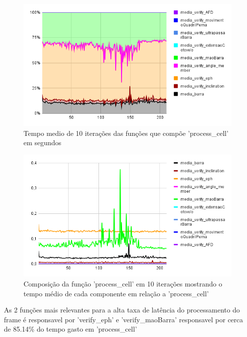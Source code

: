 \begin{figure}[!htb]
	\centering
	\includegraphics[scale=0.6]{figuras/grafico/comp_process_cell_1.png}
	\caption{Tempo medio de 10 iterações das funções que compõe 'process\_cell' em segundos}
\end{figure}

\begin{figure}[!htb]
	\centering
	\includegraphics[scale=0.6]{figuras/grafico/comp_process_cell_2.png}
	\caption{Composição da função 'process\_cell' em 10 iterações mostrando o tempo médio de cada componente em relação a  'process\_cell' }
\end{figure}

\newpage
As 2 funções mais relevantes para a alta taxa de latência do processamento do frame é responsavel por 'verify\_eph' e 'verify\_maoBarra' responsavel por cerca de 85.14\% do tempo gasto em 'process\_cell'




